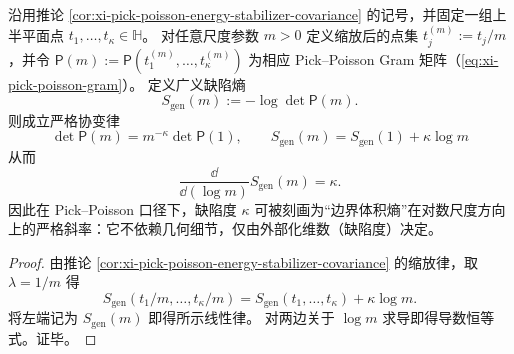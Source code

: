 
\begin{corollary}[缺陷度作为对数尺度的熵斜率：\texorpdfstring{$\frac{\dd}{\dd(\log m)}S_{\mathrm{gen}}(m)=\kappa$}{d/dlogm S_gen(m)=kappa}]\label{cor:xi-pick-poisson-entropy-derivative-visible-dimension}
沿用推论 \ref{cor:xi-pick-poisson-energy-stabilizer-covariance} 的记号，并固定一组上半平面点 \(t_1,\dots,t_\kappa\in\mathbb{H}\)。
对任意尺度参数 \(m>0\) 定义缩放后的点集 \(t^{(m)}_j:=t_j/m\)，并令 \(\mathsf P(m):=\mathsf P(t^{(m)}_1,\dots,t^{(m)}_\kappa)\) 为相应 Pick--Poisson Gram 矩阵（\eqref{eq:xi-pick-poisson-gram}）。
定义广义缺陷熵
\[
S_{\mathrm{gen}}(m):=-\log\det\mathsf P(m).
\]
则成立严格协变律
\[
\boxed{\;
\det\mathsf P(m)=m^{-\kappa}\det\mathsf P(1),\qquad
S_{\mathrm{gen}}(m)=S_{\mathrm{gen}}(1)+\kappa\log m\;}
\]
从而
\[
\boxed{\;\frac{\dd}{\dd(\log m)}S_{\mathrm{gen}}(m)=\kappa.\;}
\]
因此在 Pick--Poisson 口径下，缺陷度 \(\kappa\) 可被刻画为“边界体积熵”在对数尺度方向上的严格斜率：它不依赖几何细节，仅由外部化维数（缺陷度）决定。
\end{corollary}
\begin{proof}
由推论 \ref{cor:xi-pick-poisson-energy-stabilizer-covariance} 的缩放律，取 \(\lambda=1/m\) 得
\[
S_{\mathrm{gen}}(t_1/m,\dots,t_\kappa/m)=S_{\mathrm{gen}}(t_1,\dots,t_\kappa)+\kappa\log m.
\]
将左端记为 \(S_{\mathrm{gen}}(m)\) 即得所示线性律。
对两边关于 \(\log m\) 求导即得导数恒等式。证毕。
\end{proof}

